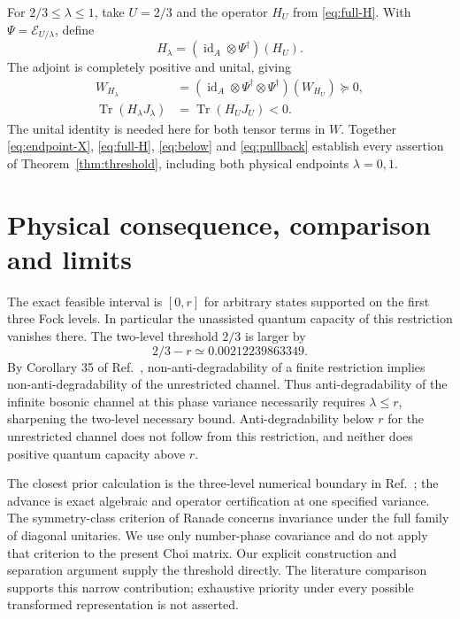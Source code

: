 \documentclass[11pt]{article}
\newcommand{\Tr}{\operatorname{Tr}}
\newcommand{\id}{\operatorname{id}}
\newcommand{\E}{\mathcal E}
\begin{document}
For $2/3\leq\lambda\leq1$, take $U=2/3$ and the operator $H_U$ from
\eqref{eq:full-H}. With $\Psi=\E_{U/\lambda}$, define
\begin{equation}\label{eq:pullback}
H_\lambda=(\id_A\otimes\Psi^\dagger)(H_U).
\end{equation}
The adjoint is completely positive and unital, giving
\begin{equation}\label{eq:pullback-W}
\begin{split}
W_{H_\lambda}&=(\id_A\otimes\Psi^\dagger\otimes\Psi^\dagger)(W_{H_U})
\succeq0,\\
\Tr(H_\lambda J_\lambda)&=\Tr(H_UJ_U)<0.
\end{split}
\end{equation}
The unital identity is needed here for both tensor terms in $W$.
Together \eqref{eq:endpoint-X}, \eqref{eq:full-H}, \eqref{eq:below} and
\eqref{eq:pullback} establish every assertion of Theorem~\ref{thm:threshold},
including both physical endpoints $\lambda=0,1$.

\section{Physical consequence, comparison and limits}
The exact feasible interval is $[0,r]$ for arbitrary states supported on the
first three Fock levels. In particular the unassisted quantum capacity of
this restriction vanishes there. The two-level threshold $2/3$ is larger
by
\begin{equation}\label{eq:delta}
2/3-r\simeq0.00212239863349.
\end{equation}
By Corollary 35 of Ref.~\cite{Mele2024}, non-anti-degradability of a finite
restriction implies non-anti-degradability of the unrestricted channel.
Thus anti-degradability of the infinite bosonic channel at this phase
variance necessarily requires $\lambda\leq r$, sharpening the two-level
necessary bound. Anti-degradability below $r$ for the unrestricted channel
does not follow from this restriction, and neither does positive quantum
capacity above $r$.

The closest prior calculation is the three-level numerical boundary in
Ref.~\cite{Mele2024}; the advance is exact algebraic and operator
certification at one specified variance. The symmetry-class criterion of
Ranade \cite{Ranade2009} concerns invariance under the full family of
diagonal unitaries. We use only number-phase covariance and do not apply
that criterion to the present Choi matrix. Our explicit construction and
separation argument supply the threshold directly. The literature comparison
supports this narrow contribution; exhaustive priority under every possible
transformed representation is not asserted.
\end{document}

